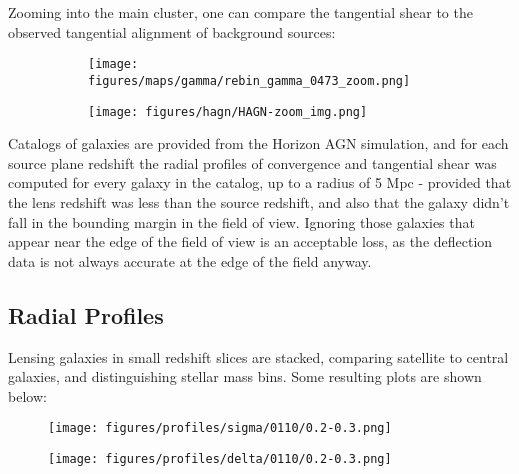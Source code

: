 \documentclass{beamer}
\begin{document}
  \begin{frame}
    Zooming into the main cluster, one can compare the tangential shear to the observed tangential alignment of background sources:

    \begin{figure}[H]
      \begin{subfigure}{0.49\textwidth}
        \texttt{[image: figures/maps/gamma/rebin\_gamma\_0473\_zoom.png]}
      \end{subfigure}
      \hfill
      \begin{subfigure}{0.35\textwidth}
        \texttt{[image: figures/hagn/HAGN-zoom\_img.png]}
      \end{subfigure}
      \hfill
    \end{figure}
  \end{frame}

  \begin{frame}
    Catalogs of galaxies are provided from the Horizon AGN simulation, and for each source plane redshift the radial profiles of convergence and tangential shear was computed for every galaxy in the catalog, up to a radius of 5 Mpc - provided that the lens redshift was less than the source redshift, and also that the galaxy didn't fall in the bounding margin in the field of view. Ignoring those galaxies that appear near the edge of the field of view is an acceptable loss, as the deflection data is not always accurate at the edge of the field anyway.
  \end{frame}

  \subsection{Radial Profiles}

  \begin{frame}
    Lensing galaxies in small redshift slices are stacked, comparing satellite to central galaxies, and distinguishing stellar mass bins. Some resulting plots are shown below:
  \end{frame}

  \begin{frame}
    \begin{figure}[H]
      \centering
      \texttt{[image: figures/profiles/sigma/0110/0.2-0.3.png]}
    \end{figure}
  \end{frame}

  \begin{frame}
    \begin{figure}[H]
      \centering
      \texttt{[image: figures/profiles/delta/0110/0.2-0.3.png]}
    \end{figure}
  \end{frame}
\end{document}
